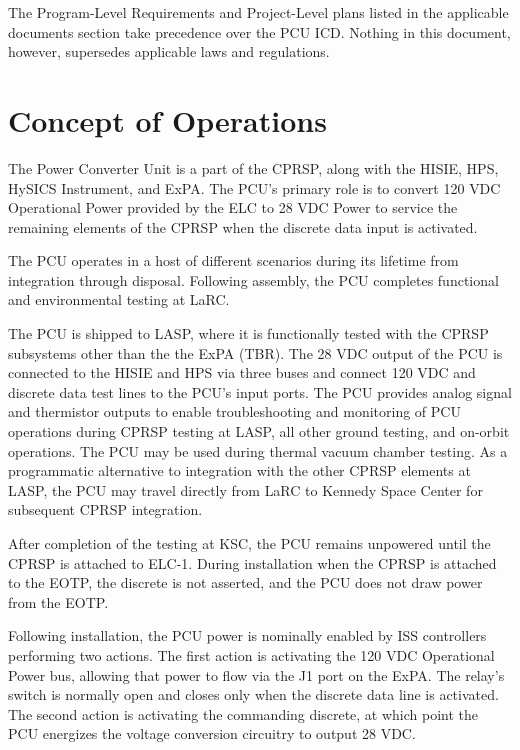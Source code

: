 The Program-Level Requirements and Project-Level plans listed in the applicable documents section take precedence over the \gls{PCU} \gls{ICD}. Nothing in this document, however, supersedes applicable laws and regulations.

\chapter{Concept of Operations  }
\label{conops}

The Power Converter Unit is a part of the \gls{CPRSP}, along with the \gls{HISIE}, \gls{HPS}, \gls{HySICS} Instrument, and \gls{ExPA}. The \gls{PCU}'s primary role is to convert 120 \gls{VDC} Operational Power provided by the \gls{ELC} to 28 \gls{VDC} Power to service the remaining elements of the \gls{CPRSP} when the discrete data input is activated.

The \gls{PCU} operates in a host of different scenarios during its lifetime from integration through disposal. Following assembly, the \gls{PCU} completes functional and environmental testing at \gls{LaRC}.

The \gls{PCU} is shipped to \gls{LASP}, where it is functionally tested with the \gls{CPRSP} subsystems other than the the \gls{ExPA} (TBR\label{tbx_1}). The 28 \gls{VDC} output of the \gls{PCU} is connected to the \gls{HISIE} and \gls{HPS} via three buses and connect 120 \gls{VDC} and discrete data test lines to the \gls{PCU}'s input ports. The \gls{PCU} provides analog signal and thermistor outputs to enable troubleshooting and monitoring of \gls{PCU} operations during \gls{CPRSP} testing at \gls{LASP}, all other ground testing, and on-orbit operations. The \gls{PCU} may be used during thermal vacuum chamber testing. As a programmatic alternative to integration with the other \gls{CPRSP} elements at \gls{LASP}, the \gls{PCU} may travel directly from \gls{LaRC} to Kennedy Space Center for subsequent \gls{CPRSP} integration.

After completion of the testing at \gls{KSC}, the \gls{PCU} remains unpowered until the \gls{CPRSP} is attached to \gls{ELC}-1. During installation when the \gls{CPRSP} is attached to the \gls{EOTP}, the discrete is not asserted, and the \gls{PCU} does not draw power from the \gls{EOTP}.

Following installation, the \gls{PCU} power is nominally enabled by \gls{ISS} controllers performing two actions. The first action is activating the 120 \gls{VDC} Operational Power bus, allowing that power to flow via the J1 port on the \gls{ExPA}. The relay's switch is normally open and closes only when the discrete data line is activated. The second action is activating the commanding discrete, at which point the \gls{PCU} energizes the voltage conversion circuitry to output 28 \gls{VDC}.

